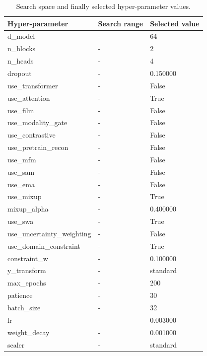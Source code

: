 \begin{table}
\caption{Search space and finally selected hyper-parameter values.}
\label{tab:hyperparameters}
\begin{tabular}{lll}
\toprule
Hyper-parameter & Search range & Selected value \\
\midrule
d\_model & - & 64 \\
n\_blocks & - & 2 \\
n\_heads & - & 4 \\
dropout & - & 0.150000 \\
use\_transformer & - & False \\
use\_attention & - & True \\
use\_film & - & False \\
use\_modality\_gate & - & False \\
use\_contrastive & - & False \\
use\_pretrain\_recon & - & False \\
use\_mfm & - & False \\
use\_sam & - & False \\
use\_ema & - & False \\
use\_mixup & - & True \\
mixup\_alpha & - & 0.400000 \\
use\_swa & - & True \\
use\_uncertainty\_weighting & - & False \\
use\_domain\_constraint & - & True \\
constraint\_w & - & 0.100000 \\
y\_transform & - & standard \\
max\_epochs & - & 200 \\
patience & - & 30 \\
batch\_size & - & 32 \\
lr & - & 0.003000 \\
weight\_decay & - & 0.001000 \\
scaler & - & standard \\
\bottomrule
\end{tabular}
\end{table}

